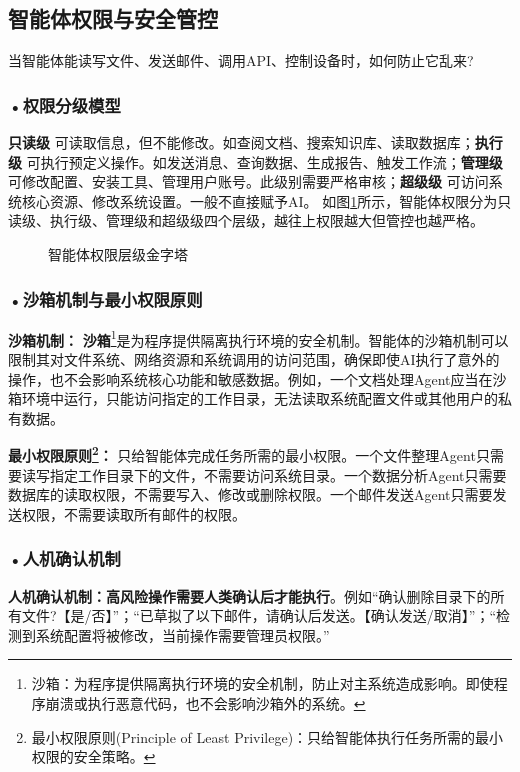 




\subsection{智能体权限与安全管控}

当智能体能读写文件、发送邮件、调用API、控制设备时，如何防止它乱来?

\subsubsection*{\textbf{•权限分级模型}}

\textbf{只读级 }可读取信息，但不能修改。如查阅文档、搜索知识库、读取数据库；\textbf{执行级 }可执行预定义操作。如发送消息、查询数据、生成报告、触发工作流；\textbf{管理级 }可修改配置、安装工具、管理用户账号。此级别需要严格审核；\textbf{超级级 }可访问系统核心资源、修改系统设置。一般不直接赋予AI。 如图\ref{fig:ch3_3_31}所示，智能体权限分为只读级、执行级、管理级和超级级四个层级，越往上权限越大但管控也越严格。

\begin{figure}[H]
\centering
{}
\caption{智能体权限层级金字塔}
\label{fig:ch3_3_31}
\end{figure}


\subsubsection*{\textbf{•沙箱机制与最小权限原则}}
\textbf{沙箱机制：} \textbf{沙箱}\footnote{沙箱：为程序提供隔离执行环境的安全机制，防止对主系统造成影响。即使程序崩溃或执行恶意代码，也不会影响沙箱外的系统。}是为程序提供隔离执行环境的安全机制。智能体的沙箱机制可以限制其对文件系统、网络资源和系统调用的访问范围，确保即使AI执行了意外的操作，也不会影响系统核心功能和敏感数据。例如，一个文档处理Agent应当在沙箱环境中运行，只能访问指定的工作目录，无法读取系统配置文件或其他用户的私有数据。

\textbf{\textbf{最小权限原则}\footnote{最小权限原则(Principle of Least Privilege)：只给智能体执行任务所需的最小权限的安全策略。}：} 只给智能体完成任务所需的最小权限。一个文件整理Agent只需要读写指定工作目录下的文件，不需要访问系统目录。一个数据分析Agent只需要数据库的读取权限，不需要写入、修改或删除权限。一个邮件发送Agent只需要发送权限，不需要读取所有邮件的权限。


\subsubsection*{\textbf{•人机确认机制}}
\textbf{人机确认机制：高风险操作需要人类确认后才能执行}。例如“确认删除目录下的所有文件?【是/否】”；“已草拟了以下邮件，请确认后发送。【确认发送/取消】”；“检测到系统配置将被修改，当前操作需要管理员权限。”

